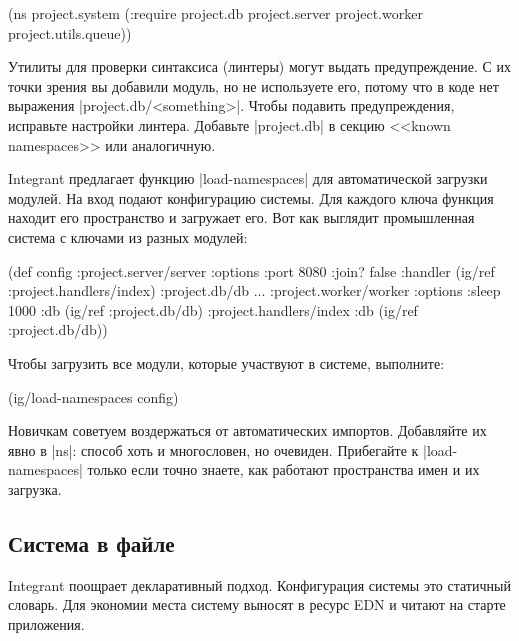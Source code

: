 \begin{english}
  \begin{clojure}
(ns project.system
  (:require project.db
            project.server
            project.worker
            project.utils.queue))
  \end{clojure}
\end{english}

Утилиты для проверки синтаксиса (линтеры) могут выдать предупреждение. С их
точки зрения вы добавили модуль, но не используете его, потому что в коде нет
выражения \spverb|project.db/<something>|. Чтобы подавить предупреждения,
исправьте настройки линтера. Добавьте \spverb|project.db| в секцию <<known
namespaces>> или аналогичную.

Integrant предлагает функцию \spverb|load-namespaces| для автоматической
загрузки модулей. На вход подают конфигурацию системы. Для каждого ключа функция
находит его пространство и загружает его. Вот как выглядит промышленная система
с ключами из разных модулей:

\begin{english}
  \begin{clojure}
(def config
  {:project.server/server
   {:options {:port 8080 :join? false}
    :handler (ig/ref :project.handlers/index)}
   :project.db/db {...}
   :project.worker/worker
   {:options {:sleep 1000}
    :db      (ig/ref :project.db/db)}
   :project.handlers/index
   {:db (ig/ref :project.db/db)}})
  \end{clojure}
\end{english}

\noindent
Чтобы загрузить все модули, которые участвуют в системе, выполните:

\begin{english}
  \begin{clojure}
(ig/load-namespaces config)
  \end{clojure}
\end{english}

Новичкам советуем воздержаться от автоматических импортов. Добавляйте их явно в
\spverb|ns|: способ хоть и многословен, но очевиден. Прибегайте к
\spverb|load-namespaces| только если точно знаете, как работают пространства
имен и их загрузка.

\subsection{Система в файле}

Integrant поощрает декларативный подход. Конфигурация системы это статичный
словарь. Для экономии места систему выносят в ресурс EDN и читают на старте
приложения.


